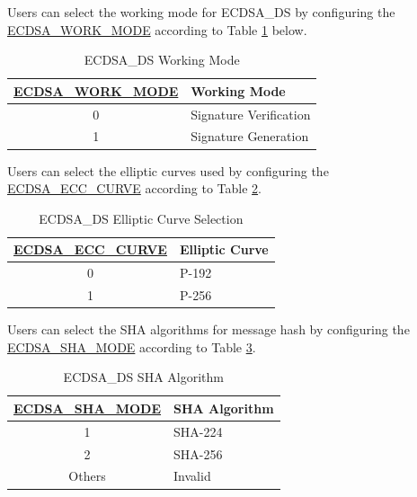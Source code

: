 \documentclass[main\_\_EN.tex]{subfiles}
\begin{document}
Users can select the working mode for ECDSA\_DS by configuring the \hyperref[fielddesc:ECDSAWORKMODE]{ECDSA\_WORK\_MODE} according to Table \ref{tab:ecdsa-working-mode} below.

\begin{table}[H]
    \centering
    \caption{ECDSA\_DS Working Mode}
    \label{tab:ecdsa-working-mode}
    \begin{tabular}{ | c | l | }
    \hline
        \rowcolor{lightgray}
        \textbf{\hyperref[fielddesc:ECDSAWORKMODE]{ECDSA\_WORK\_MODE}}      & \textbf{Working Mode}\\\hline
        0                       & Signature Verification  \\\hline
        1                       & Signature Generation     \\\hline
    \end{tabular}
\end{table}

Users can select the elliptic curves used by configuring the \hyperref[fielddesc:ECDSAECCCURVE]{ECDSA\_ECC\_CURVE} according to Table \ref{tab:ecdsa-curve-selection}.

\begin{table}[H]
    \centering
    \caption{ECDSA\_DS Elliptic Curve Selection}
    \label{tab:ecdsa-curve-selection}
    \begin{tabular}{ | c | l | }
    \hline
        \rowcolor{lightgray}
        \textbf{\hyperref[fielddesc:ECDSAECCCURVE]{ECDSA\_ECC\_CURVE}}      & \textbf{Elliptic Curve}\\
        \hline
        0                       & P-192    \\\hline
        1                       & P-256    \\\hline
    \end{tabular}
\end{table}

Users can select the SHA algorithms for message hash by configuring the \hyperref[fielddesc:ECDSASHAMODE]{ECDSA\_SHA\_MODE} according to Table \ref{tab:ecdsa-sha-algorithms}.

\begin{table}[H]
    \centering
    \caption{ECDSA\_DS SHA Algorithm}
    \label{tab:ecdsa-sha-algorithms}
    \begin{tabular}{ | c | l | }
    \hline
        \rowcolor{lightgray}
        \textbf{\hyperref[fielddesc:ECDSASHAMODE]{ECDSA\_SHA\_MODE}}      & \textbf{SHA Algorithm}\\
        \hline
        1                       & SHA-224    \\\hline
        2                       & SHA-256    \\\hline
        Others                  & Invalid    \\\hline
    \end{tabular}
\end{table}
\end{document}
